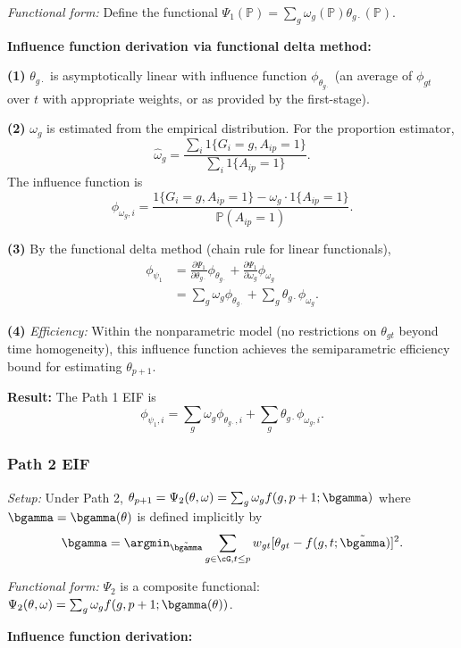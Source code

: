 \documentclass{article}
\renewcommand{\P}{\mathbb{P}}
\begin{document}
\textit{Functional form:} Define the functional $\Psi_1(\P) = \sum_g \omega_g(\P) \theta_{g\cdot}(\P)$.

\textbf{Influence function derivation via functional delta method:}

\textbf{(1)} $\theta_{g\cdot}$ is asymptotically linear with influence function $\phi_{\theta_{g\cdot}}$ (an average of $\phi_{gt}$ over $t$ with appropriate weights, or as provided by the first-stage).

\textbf{(2)} $\omega_g$ is estimated from the empirical distribution. For the proportion estimator,
\[
\widehat{\omega}_g = \frac{\sum_i 1\{G_i = g, A_{ip} = 1\}}{\sum_i 1\{A_{ip} = 1\}}.
\]
The influence function is
\[
\phi_{\omega_g,i} = \frac{1\{G_i = g, A_{ip} = 1\} - \omega_g \cdot 1\{A_{ip} = 1\}}{\P(A_{ip} = 1)}.
\]

\textbf{(3)} By the functional delta method (chain rule for linear functionals),
\begin{align*}
\phi_{\psi_1} &= \frac{\partial \Psi_1}{\partial \theta_{g\cdot}} \phi_{\theta_{g\cdot}} + \frac{\partial \Psi_1}{\partial \omega_g} \phi_{\omega_g} \\
&= \sum_{g} \omega_g \phi_{\theta_{g\cdot}} + \sum_g \theta_{g\cdot} \phi_{\omega_g}.
\end{align*}

\textbf{(4)} \textit{Efficiency:} Within the nonparametric model (no restrictions on $\theta_{gt}$ beyond time homogeneity), this influence function achieves the semiparametric efficiency bound for estimating $\theta_{p+1}$.

\textbf{Result:} The Path 1 EIF is
\[
\phi_{\psi_1,i} = \sum_{g} \omega_g \phi_{\theta_{g\cdot},i} + \sum_g \theta_{g\cdot} \phi_{\omega_g,i}.
\]

\subsubsection{Path 2 EIF}\label{app:eif2}

\textit{Setup:} Under Path 2, $\theta_{p+1} = \Psi_2(\theta, \omega) = \sum_g \omega_g f(g,p+1;\bgamma)$ where $\bgamma = \bgamma(\theta)$ is defined implicitly by
\[
\bgamma = \argmin_{\tilde{\bgamma}} \sum_{g \in \cG, t \leq p} w_{gt} [\theta_{gt} - f(g,t;\tilde{\bgamma})]^2.
\]

\textit{Functional form:} $\Psi_2$ is a composite functional: $\Psi_2(\theta,\omega) = \sum_g \omega_g f(g,p+1; \bgamma(\theta))$.

\textbf{Influence function derivation:}
\end{document}
